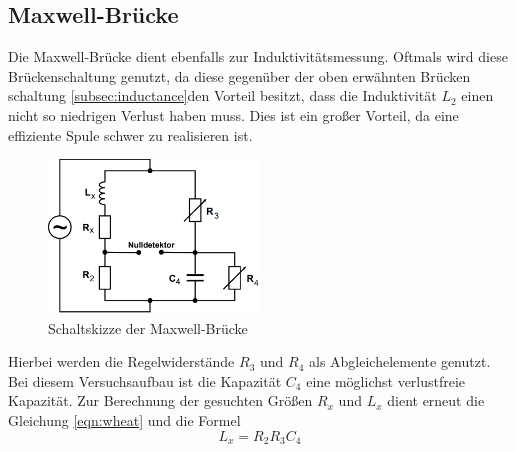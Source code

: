 \subsection{Maxwell-Brücke}
Die Maxwell-Brücke dient ebenfalls zur Induktivitätsmessung. Oftmals wird diese Brückenschaltung genutzt, da diese gegenüber der oben erwähnten Brücken
schaltung \ref{subsec:inductance}den Vorteil besitzt, dass die Induktivität $L_2$ einen nicht so niedrigen Verlust haben muss. Dies ist ein großer Vorteil, da eine 
effiziente Spule schwer zu realisieren ist.
\begin{figure}
    \centering
    \caption{Schaltskizze der Maxwell-Brücke}
    \label{fig:maxwell}
    \includegraphics[width=0.5\textwidth]{bridges/maxwell.png}
\end{figure}
Hierbei werden die Regelwiderstände $R_3$ und $R_4$ als Abgleichelemente genutzt. Bei diesem Versuchsaufbau ist die Kapazität $C_4$ eine möglichst verlustfreie 
Kapazität. Zur Berechnung der gesuchten Größen $R_x$ und $L_x$ dient erneut die Gleichung \eqref{eqn:wheat} und die Formel
\begin{equation}
    L_x = R_2 R_3 C_4 \label{eqn:inducmesmaxwell}
\end{equation}
